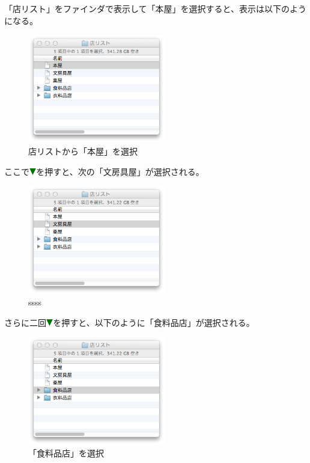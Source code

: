 \documentclass[twoside]{wiss}
\def\downtriangle{\includegraphics[width=3mm,bb=0 0 36 36]{figures/downtriangle.pdf}}
\begin{document}
「店リスト」をファインダで表示して「本屋」を選択すると、表示は以下のようになる。

\begin{figure}[H]
\centerline{\includegraphics[width=60mm,bb=0 0 344 272]{figures/9b121bec45e5b480e5ac64fdd0f82592.png}}
\caption{店リストから「本屋」を選択}
\label{screenshot2}
\end{figure}

\noindent
ここで{\downtriangle}を押すと、次の「文房具屋」が選択される。

\begin{figure}[H]
\centerline{\includegraphics[width=60mm,bb=0 0 344 272]{figures/f43016d1b524baf414f2c32c48fe9588.png}}
\caption{ssss}
\label{「文房具屋」を選択}
\end{figure}

\noindent
さらに二回{\downtriangle}を押すと、以下のように「食料品店」が選択される。

\begin{figure}[H]
\centerline{\includegraphics[width=60mm,bb=0 0 344 272]{figures/c074cd6daec3da0341125d1492b8a09c.png}}
\caption{「食料品店」を選択}
\label{screenshot4}
\end{figure}
\end{document}
